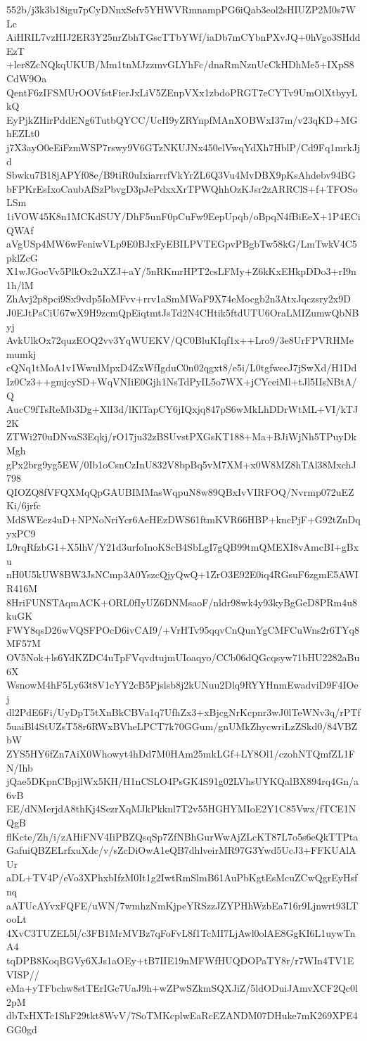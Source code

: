 552b/j3k3b18igu7pCyDNnxSefv5YHWVRmnampPG6iQab3eol2sHIUZP2M0s7WLc
AiHRIL7vzHIJ2ER3Y25nrZbhTGscTTbYWf/iaDb7mCYbnPXvJQ+0hVgo3SHddEzT
+ler8ZcNQkqUKUB/Mm1tnMJzzmvGLYhFc/dnaRmNznUcCkHDhMe5+IXpS8CdW9Oa
QentF6zIFSMUrOOVfstFierJxLiV5ZEnpVXx1zbdoPRGT7eCYTv9UmOlXtbyyLkQ
EyPjkZHirPddENg6TutbQYCC/UcH9yZRYnpfMAnXOBWxI37m/v23qKD+MGhEZLt0
j7X3ayO0eEiFzmWSP7rswy9V6GTzNKUJNx450elVwqYdXh7HblP/Cd9Fq1mrkJjd
Sbwku7B18jAPYf08e/B9tiR0uIxiarrrfVkYrZL6Q3Vu4MvDBX9pKsAhdebv94BG
bFPKrEsIxoCaubAfSzPbvgD3pJePdxxXrTPWQhhOzKJsr2zARRClS+f+TFOSoLSm
1iVOW45K8n1MCKdSUY/DhF5unF0pCuFw9EepUpqb/oBpqN4fBiEeX+1P4ECiQWAf
aVgUSp4MW6wFeniwVLp9E0BJxFyEBILPVTEGpvPBgbTw58kG/LmTwkV4C5pklZcG
X1wJGocVv5PlkOx2uXZJ+aY/5nRKmrHPT2csLFMy+Z6kKxEHkpDDo3+rI9n1h/lM
ZhAvj2p8pci9Sx9vdp5IoMFvv+rrv1aSmMWaF9X74eMocgb2n3AtxJqczsry2x9D
J0EJtPsCiU67wX9H9zcmQpEiqtmtJsTd2N4CHtik5ftdUTU6OraLMIZumwQbNByj
AvkUlkOx72quzEOQ2vv3YqWUEKV/QC0BluKIqf1x++Lro9/3e8UrFPVRHMemumkj
cQNq1tMoA1v1WwnlMpxD4ZxWfIgduC0n02qgxt8/e5i/L0tgfweeJ7jSwXd/H1Dd
Iz0Cz3++gmjcySD+WqVNIiE0Gjh1NsTdPyIL5o7WX+jCYceiMl+tJl5IIsNBtA/Q
AucC9fTsReMb3Dg+XlI3d/lKlTapCY6jIQxjq847pS6wMkLhDDrWtML+VI/kTJ2K
ZTWi270uDNvaS3Eqkj/rO17ju32zBSUvstPXGsKT188+Ma+BJiWjNh5TPuyDkMgh
gPx2brg9yg5EW/0Ib1oCsnCzInU832V8bpBq5vM7XM+x0W8MZ8hTAl38MxchJ798
QIOZQ8fVFQXMqQpGAUBIMMasWqpuN8w89QBxIvVIRFOQ/Nvrmp072uEZKi/6jrfc
MdSWEez4uD+NPNoNriYcr6AeHEzDWS61ftmKVR66HBP+kncPjF+G92tZnDqyxPC9
L9rqRfzbG1+X5lhV/Y21d3urfoInoKScB4SbLgI7gQB99tmQMEXI8vAmcBI+gBxu
nH0U5kUW8BW3JsNCmp3A0YszcQjyQwQ+1ZrO3E92E0iq4RGsuF6zgmE5AWIR416M
8HriFUNSTAqmACK+ORL0fIyUZ6DNMsaoF/nldr98wk4y93kyBgGeD8PRm4u8kuGK
FWY8qsD26wVQSFPOcD6ivCAI9/+VrHTv95qqvCnQunYgCMFCuWns2r6TYq8MF57M
OV5Nok+ls6YdKZDC4uTpFVqvdtujmUIoaqyo/CCb06dQGcqsyw71bHU2282aBu6X
WsnowM4hF5Ly63t8V1cYY2cB5Pjslsb8j2kUNuu2Dlq9RYYHnmEwadviD9F4IOej
dl2PdE6Fi/UyDpT5tXnBkCBVa1q7UfhZx3+xBjcgNrKcpnr3wJ0lTeWNv3q/rPTf
5uaiBl4StUZsT58r6RWxBVheLPCT7k70GGum/gnUMkZhycwriLzZSkd0/84VBZbW
ZYS5HY6fZn7AiX0Whowyt4hDd7M0HAm25mkLGf+LY8Ol1/czohNTQmfZL1FN/Ihb
jQae5DKpnCBpjlWx5KH/H1nCSLO4PsGK4S91g02LVhsUYKQalBX894rq4Gn/a6vB
EE/dNMerjdA8thKj4SezrXqMJkPkknl7T2v55HGHYMIoE2Y1C85Vwx/fTCE1NQgB
flKcte/Zh/i/zAHiFNV4IiPBZQsqSp7ZfNBhGurWwAjZLcKT87L7o5s6eQkTTPta
GafuiQBZELrfxuXdc/v/sZcDiOwA1eQB7dhlveirMR97G3Ywd5UcJ3+FFKUAlAUr
aDL+TV4P/eVo3XPhxbIfzM0It1g2IwtRmSlmB61AuPbKgtEsMcuZCwQgrEyHsfnq
aATUcAYvxFQFE/uWN/7wmhzNmKjpeYRSzzJZYPHhWzbEa716r9Ljnwrt93LTooLt
4XvC3TUZEL5l/c3FB1MrMVBz7qFoFvL8f1TcMI7LjAwl0olAE8GgKI6L1uywTnA4
tqDPB8KoqBGVy6XJs1aOEy+tB7IIE19nMFWfHUQDOPaTY8r/r7WIn4TV1EVISP//
eMa+yTFbchw8stTErIGc7UaJ9h+wZPwSZkmSQXJiZ/5ldODuiJAmvXCF2Qc0l2pM
dbTxHXTc1ShF29tkt8WvV/7SoTMKcplwEaRcEZANDM07DHuke7mK269XPE4GG0gd
